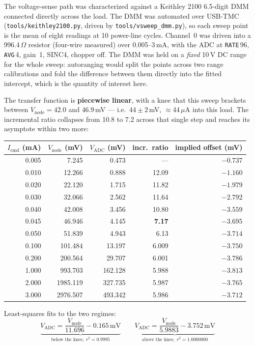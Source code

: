 \documentclass[11pt]{article}
\begin{document}
The voltage-sense path was characterized against a Keithley 2100 6.5-digit DMM
connected directly across the load. The DMM was automated over USB-TMC
(\texttt{tools/keithley2100.py}, driven by \texttt{tools/vsweep\_dmm.py}), so
each sweep point is the mean of eight readings at 10 power-line cycles.
Channel~0 was driven into a 996.4\,$\Omega$ resistor (four-wire measured)
over 0.005--3\,mA, with the ADC at \texttt{RATE}\,96, \texttt{AVG}\,4, gain~1,
SINC4, chopper off. The DMM was held on a \emph{fixed} 10\,V DC range for the
whole sweep: autoranging would split the points across two range calibrations
and fold the difference between them directly into the fitted intercept, which
is the quantity of interest here.

The transfer function is \textbf{piecewise linear}, with a knee that this sweep
brackets between $V_\text{node}=42.0$ and $46.9$\,mV --- i.e.\ $44\pm2$\,mV,
$\approx$44\,$\mu$A into this load. The incremental ratio collapses from 10.8 to
7.2 across that single step and reaches its asymptote within two more:

\medskip
\noindent\begin{tabular}{@{}rrrrr@{}}
\toprule
\textbf{$I_\text{cmd}$ (mA)} & \textbf{$V_\text{node}$ (mV)} & \textbf{$V_\text{ADC}$ (mV)} & \textbf{incr.\ ratio} & \textbf{implied offset (mV)} \\
\midrule
0.005 & 7.245   & 0.473   & ---   & $-0.737$ \\
0.010 & 12.266  & 0.888   & 12.09 & $-1.160$ \\
0.020 & 22.120  & 1.715   & 11.82 & $-1.979$ \\
0.030 & 32.066  & 2.562   & 11.64 & $-2.792$ \\
0.040 & 42.008  & 3.456   & 10.80 & $-3.559$ \\
\midrule
0.045 & 46.946  & 4.145   & \textbf{7.17} & $-3.695$ \\
0.050 & 51.839  & 4.943   & 6.13  & $-3.714$ \\
0.100 & 101.484 & 13.197  & 6.009 & $-3.750$ \\
0.200 & 200.564 & 29.707  & 6.001 & $-3.786$ \\
1.000 & 993.703 & 162.128 & 5.988 & $-3.813$ \\
2.000 & 1985.119 & 327.735 & 5.987 & $-3.765$ \\
3.000 & 2976.507 & 493.342 & 5.986 & $-3.712$ \\
\bottomrule
\end{tabular}
\medskip

Least-squares fits to the two regimes:
\[
  \underbrace{V_\text{ADC} = \frac{V_\text{node}}{11.696} - 0.165\,\text{mV}}_{\text{below the knee},\ r^2=0.9995}
  \qquad
  \underbrace{V_\text{ADC} = \frac{V_\text{node}}{5.9883} - 3.752\,\text{mV}}_{\text{above the knee},\ r^2=1.0000000}
\]
\end{document}
